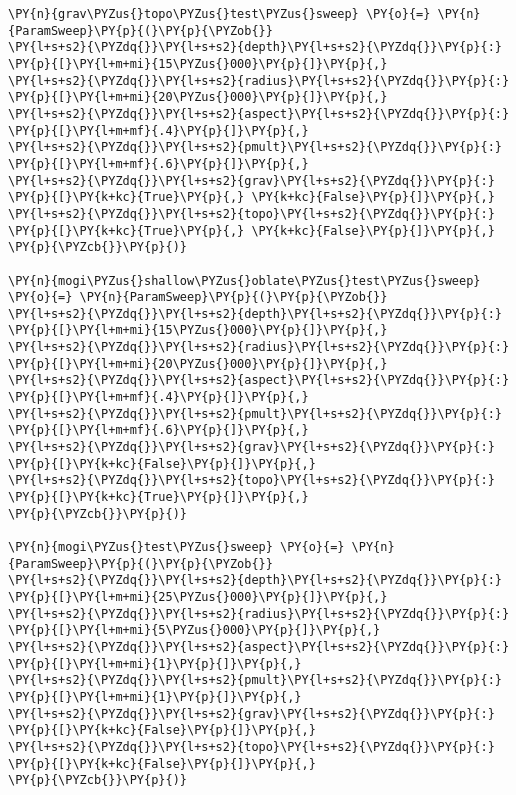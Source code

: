 \begin{tcolorbox}[breakable, size=fbox, boxrule=1pt, pad at break*=1mm,colback=cellbackground, colframe=cellborder]
\begin{Verbatim}[commandchars=\\\{\}]
\PY{n}{grav\PYZus{}topo\PYZus{}test\PYZus{}sweep} \PY{o}{=} \PY{n}{ParamSweep}\PY{p}{(}\PY{p}{\PYZob{}}
\PY{l+s+s2}{\PYZdq{}}\PY{l+s+s2}{depth}\PY{l+s+s2}{\PYZdq{}}\PY{p}{:} \PY{p}{[}\PY{l+m+mi}{15\PYZus{}000}\PY{p}{]}\PY{p}{,}
\PY{l+s+s2}{\PYZdq{}}\PY{l+s+s2}{radius}\PY{l+s+s2}{\PYZdq{}}\PY{p}{:} \PY{p}{[}\PY{l+m+mi}{20\PYZus{}000}\PY{p}{]}\PY{p}{,}
\PY{l+s+s2}{\PYZdq{}}\PY{l+s+s2}{aspect}\PY{l+s+s2}{\PYZdq{}}\PY{p}{:} \PY{p}{[}\PY{l+m+mf}{.4}\PY{p}{]}\PY{p}{,}
\PY{l+s+s2}{\PYZdq{}}\PY{l+s+s2}{pmult}\PY{l+s+s2}{\PYZdq{}}\PY{p}{:} \PY{p}{[}\PY{l+m+mf}{.6}\PY{p}{]}\PY{p}{,}
\PY{l+s+s2}{\PYZdq{}}\PY{l+s+s2}{grav}\PY{l+s+s2}{\PYZdq{}}\PY{p}{:} \PY{p}{[}\PY{k+kc}{True}\PY{p}{,} \PY{k+kc}{False}\PY{p}{]}\PY{p}{,}
\PY{l+s+s2}{\PYZdq{}}\PY{l+s+s2}{topo}\PY{l+s+s2}{\PYZdq{}}\PY{p}{:} \PY{p}{[}\PY{k+kc}{True}\PY{p}{,} \PY{k+kc}{False}\PY{p}{]}\PY{p}{,}
\PY{p}{\PYZcb{}}\PY{p}{)}

\PY{n}{mogi\PYZus{}shallow\PYZus{}oblate\PYZus{}test\PYZus{}sweep} \PY{o}{=} \PY{n}{ParamSweep}\PY{p}{(}\PY{p}{\PYZob{}}
\PY{l+s+s2}{\PYZdq{}}\PY{l+s+s2}{depth}\PY{l+s+s2}{\PYZdq{}}\PY{p}{:} \PY{p}{[}\PY{l+m+mi}{15\PYZus{}000}\PY{p}{]}\PY{p}{,}
\PY{l+s+s2}{\PYZdq{}}\PY{l+s+s2}{radius}\PY{l+s+s2}{\PYZdq{}}\PY{p}{:} \PY{p}{[}\PY{l+m+mi}{20\PYZus{}000}\PY{p}{]}\PY{p}{,}
\PY{l+s+s2}{\PYZdq{}}\PY{l+s+s2}{aspect}\PY{l+s+s2}{\PYZdq{}}\PY{p}{:} \PY{p}{[}\PY{l+m+mf}{.4}\PY{p}{]}\PY{p}{,}
\PY{l+s+s2}{\PYZdq{}}\PY{l+s+s2}{pmult}\PY{l+s+s2}{\PYZdq{}}\PY{p}{:} \PY{p}{[}\PY{l+m+mf}{.6}\PY{p}{]}\PY{p}{,}
\PY{l+s+s2}{\PYZdq{}}\PY{l+s+s2}{grav}\PY{l+s+s2}{\PYZdq{}}\PY{p}{:} \PY{p}{[}\PY{k+kc}{False}\PY{p}{]}\PY{p}{,}
\PY{l+s+s2}{\PYZdq{}}\PY{l+s+s2}{topo}\PY{l+s+s2}{\PYZdq{}}\PY{p}{:} \PY{p}{[}\PY{k+kc}{True}\PY{p}{]}\PY{p}{,}
\PY{p}{\PYZcb{}}\PY{p}{)}

\PY{n}{mogi\PYZus{}test\PYZus{}sweep} \PY{o}{=} \PY{n}{ParamSweep}\PY{p}{(}\PY{p}{\PYZob{}}
\PY{l+s+s2}{\PYZdq{}}\PY{l+s+s2}{depth}\PY{l+s+s2}{\PYZdq{}}\PY{p}{:} \PY{p}{[}\PY{l+m+mi}{25\PYZus{}000}\PY{p}{]}\PY{p}{,}
\PY{l+s+s2}{\PYZdq{}}\PY{l+s+s2}{radius}\PY{l+s+s2}{\PYZdq{}}\PY{p}{:} \PY{p}{[}\PY{l+m+mi}{5\PYZus{}000}\PY{p}{]}\PY{p}{,}
\PY{l+s+s2}{\PYZdq{}}\PY{l+s+s2}{aspect}\PY{l+s+s2}{\PYZdq{}}\PY{p}{:} \PY{p}{[}\PY{l+m+mi}{1}\PY{p}{]}\PY{p}{,}
\PY{l+s+s2}{\PYZdq{}}\PY{l+s+s2}{pmult}\PY{l+s+s2}{\PYZdq{}}\PY{p}{:} \PY{p}{[}\PY{l+m+mi}{1}\PY{p}{]}\PY{p}{,}
\PY{l+s+s2}{\PYZdq{}}\PY{l+s+s2}{grav}\PY{l+s+s2}{\PYZdq{}}\PY{p}{:} \PY{p}{[}\PY{k+kc}{False}\PY{p}{]}\PY{p}{,}
\PY{l+s+s2}{\PYZdq{}}\PY{l+s+s2}{topo}\PY{l+s+s2}{\PYZdq{}}\PY{p}{:} \PY{p}{[}\PY{k+kc}{False}\PY{p}{]}\PY{p}{,}
\PY{p}{\PYZcb{}}\PY{p}{)}


\end{Verbatim}
\end{tcolorbox}
